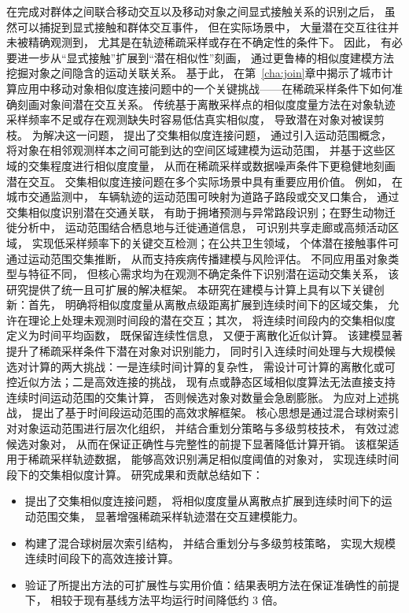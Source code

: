 在完成对群体之间联合移动交互以及移动对象之间显式接触关系的识别之后， 虽然可以捕捉到显式接触和群体交互事件， 但在实际场景中， 大量潜在交互往往并未被精确观测到， 尤其是在轨迹稀疏采样或存在不确定性的条件下。 因此， 有必要进一步从“显式接触”扩展到“潜在相似性”刻画， 通过更鲁棒的相似度建模方法挖掘对象之间隐含的运动关联关系。 基于此， 在第~\ref{cha:join}章中揭示了城市计算应用中移动对象相似度连接问题中的一个关键挑战——在稀疏采样条件下如何准确刻画对象间潜在交互关系。 传统基于离散采样点的相似度度量方法在对象轨迹采样频率不足或存在观测缺失时容易低估真实相似度， 导致潜在对象对被误剪枝。 为解决这一问题， 提出了交集相似度连接问题， 通过引入运动范围概念， 将对象在相邻观测样本之间可能到达的空间区域建模为运动范围， 并基于这些区域的交集程度进行相似度度量， 从而在稀疏采样或数据噪声条件下更稳健地刻画潜在交互。 交集相似度连接问题在多个实际场景中具有重要应用价值。 例如， 在城市交通监测中， 车辆轨迹的运动范围可映射为道路子路段或交叉口集合， 通过交集相似度识别潜在交通关联， 有助于拥堵预测与异常路段识别；在野生动物迁徙分析中， 运动范围结合栖息地与迁徙通道信息， 可识别共享走廊或高频活动区域， 实现低采样频率下的关键交互检测；在公共卫生领域， 个体潜在接触事件可通过运动范围交集推断， 从而支持疾病传播建模与风险评估。 不同应用虽对象类型与特征不同， 但核心需求均为在观测不确定条件下识别潜在运动交集关系， 该研究提供了统一且可扩展的解决框架。 本研究在建模与计算上具有以下关键创新：首先， 明确将相似度度量从离散点级距离扩展到连续时间下的区域交集， 允许在理论上处理未观测时间段的潜在交互；其次， 将连续时间段内的交集相似度定义为时间平均函数， 既保留连续性信息， 又便于离散化近似计算。 该建模显著提升了稀疏采样条件下潜在对象对识别能力， 同时引入连续时间处理与大规模候选对计算的两大挑战：一是连续时间计算的复杂性， 需设计可计算的离散化或可控近似方法；二是高效连接的挑战， 现有点或静态区域相似度算法无法直接支持连续时间运动范围的交集计算， 否则候选对象对数量会急剧膨胀。 为应对上述挑战， 提出了基于时间段运动范围的高效求解框架。 核心思想是通过混合球树索引对对象运动范围进行层次化组织， 并结合重划分策略与多级剪枝技术， 有效过滤候选对象对， 从而在保证正确性与完整性的前提下显著降低计算开销。 该框架适用于稀疏采样轨迹数据， 能够高效识别满足相似度阈值的对象对， 实现连续时间段下的交集相似度计算。 研究成果和贡献总结如下：
\begin{itemize}
    \item 提出了交集相似度连接问题， 将相似度度量从离散点扩展到连续时间下的运动范围交集， 显著增强稀疏采样轨迹潜在交互建模能力。
    \item 构建了混合球树层次索引结构， 并结合重划分与多级剪枝策略， 实现大规模连续时间段下的高效连接计算。
    \item 验证了所提出方法的可扩展性与实用价值：结果表明方法在保证准确性的前提下， 相较于现有基线方法平均运行时间降低约 3 倍。
\end{itemize}

